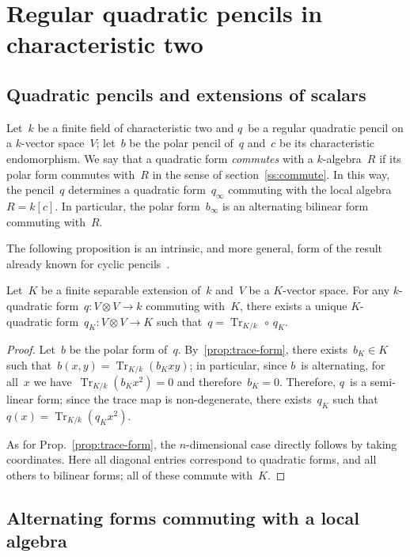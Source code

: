 \documentclass{lms}
\DeclareMathOperator\Tr{Tr}
\begin{document}
\section{Regular quadratic pencils in characteristic two}
\label{S:quad-reg}
\subsection{Quadratic pencils and extensions of scalars}
Let~$k$ be a finite field of characteristic two and $q$~be a regular
quadratic pencil on a $k$-vector space~$V$;
let~$b$ be the polar pencil of~$q$ and~$c$ be its characteristic endomorphism.
We say that a quadratic form \emph{commutes} with a $k$-algebra~$R$ if
its polar form commutes with~$R$ in the sense of
section~\ref{ss:commute}.
In this way, the pencil~$q$ determines a quadratic form~$q_{∞}$
commuting with the local algebra~$R = k[c]$.
In particular, the polar form~$b_{∞}$ is an alternating bilinear form
commuting with~$R$.

The following proposition is an intrinsic, and more general, form
of the result already known for cyclic pencils~\cite[Prop.~5]{MPG2013}.

\begin{prop} \label{prop:trace-quad}
Let~$K$ be a finite separable extension of~$k$ and~$V$ be a $K$-vector
space. For any $k$-quadratic form~$q: V ⊗ V → k$ commuting with~$K$,
there exists a unique $K$-quadratic form~$q_K: V ⊗ V → K$ such that~$q =
\Tr_{K/k} \, ∘ \, q_K$.
\end{prop}

\begin{proof}
Let~$b$ be the polar form of~$q$. By~\ref{prop:trace-form},
there exists~$b_K ∈ K$
such that~$b(x,y) = \Tr_{K/k} (b_K xy)$; in particular, since $b$~is
alternating, for all~$x$ we have~$\Tr_{K/k} (b_K x^2) = 0$ and
therefore~$b_K = 0$. Therefore, $q$~is a semi-linear form; since the
trace map is non-degenerate, there exists~$q_K$ such that~$q(x) =
\Tr_{K/k} (q_K x^2)$.

As for Prop.~\ref{prop:trace-form}, the $n$-dimensional case directly follows by
taking coordinates. Here all diagonal entries correspond to quadratic
forms, and all others to bilinear forms; all of these commute with~$K$.
\end{proof}

\subsection{Alternating forms commuting with a local algebra}
\label{SS:alt-pencil}
\end{document}
